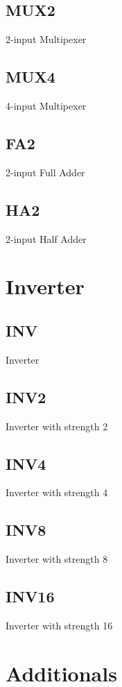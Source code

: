 \documentclass[12pt, a4paper, twoside, titlepage]{article}
\begin{document}
\subsection{MUX2}
2-input Multipexer

\subsection{MUX4}
4-input Multipexer


\subsection{FA2}
2-input Full Adder

\subsection{HA2}
2-input Half Adder


\section{Inverter}

\subsection{INV}
Inverter

\subsection{INV2}
Inverter with strength 2

\subsection{INV4}
Inverter with strength 4

\subsection{INV8}
Inverter with strength 8

\subsection{INV16}
Inverter with strength 16


\section{Additionals}
\end{document}
